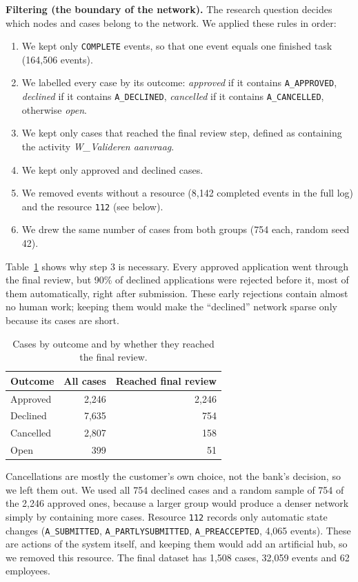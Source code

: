 \documentclass[12pt, a4paper]{article}
\begin{document}
\textbf{Filtering (the boundary of the network).} The research question decides which nodes and cases belong to the network. We applied these rules in order:
\begin{enumerate}[itemsep=2pt]
  \item We kept only \texttt{COMPLETE} events, so that one event equals one finished task (164,506 events).
  \item We labelled every case by its outcome: \emph{approved} if it contains \texttt{A\_APPROVED}, \emph{declined} if it contains \texttt{A\_DECLINED}, \emph{cancelled} if it contains \texttt{A\_CANCELLED}, otherwise \emph{open}.
  \item We kept only cases that reached the final review step, defined as containing the activity \emph{W\_Valideren aanvraag}.
  \item We kept only approved and declined cases.
  \item We removed events without a resource (8,142 completed events in the full log) and the resource \texttt{112} (see below).
  \item We drew the same number of cases from both groups (754 each, random seed 42).
\end{enumerate}

Table~\ref{tab:outcomes} shows why step 3 is necessary. Every approved application went through the final review, but 90\% of declined applications were rejected before it, most of them automatically, right after submission. These early rejections contain almost no human work; keeping them would make the ``declined'' network sparse only because its cases are short.

\begin{table}[h]
\centering
\caption{Cases by outcome and by whether they reached the final review.}
\label{tab:outcomes}
\begin{tabular}{lrr}
\toprule
Outcome & All cases & Reached final review \\
\midrule
Approved  & 2,246 & 2,246 \\
Declined  & 7,635 & 754 \\
Cancelled & 2,807 & 158 \\
Open      & 399   & 51 \\
\bottomrule
\end{tabular}
\end{table}

Cancellations are mostly the customer's own choice, not the bank's decision, so we left them out. We used all 754 declined cases and a random sample of 754 of the 2,246 approved ones, because a larger group would produce a denser network simply by containing more cases. Resource \texttt{112} records only automatic state changes (\texttt{A\_SUBMITTED}, \texttt{A\_PARTLYSUBMITTED}, \texttt{A\_PREACCEPTED}, 4,065 events). These are actions of the system itself, and keeping them would add an artificial hub, so we removed this resource. The final dataset has 1,508 cases, 32,059 events and 62 employees.
\end{document}

